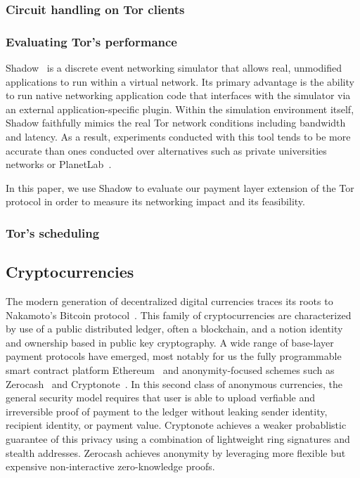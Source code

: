 \subsubsection{Circuit handling on Tor clients}

\subsubsection{Evaluating Tor's performance}
Shadow~\cite{jansen2011shadow} is a discrete event networking simulator that allows
real, unmodified applications to run within a virtual network. Its primary
advantage is the ability to run native networking application code that
interfaces with the simulator via an external application-specific
plugin. Within the simulation environment itself, Shadow faithfully mimics the
real Tor network conditions including bandwidth and latency. As a result,
experiments conducted with this tool tends to be more accurate than ones
conducted over alternatives such as private universities networks or
PlanetLab~\cite{Chun:2003:POT:956993.956995}.

In this paper, we use Shadow to evaluate our payment layer extension of the Tor
protocol in order to measure its networking impact and its feasibility.
\subsubsection{Tor's scheduling}


\subsection{Cryptocurrencies}

The modern generation of decentralized digital currencies traces its roots to
Nakamoto's Bitcoin protocol~\cite{nakamoto2008bitcoin}. This family of
cryptocurrencies are characterized by use of a public distributed ledger, often
a blockchain, and a notion identity and ownership based in public key
cryptography. A wide range of base-layer payment protocols have emerged, most
notably for us the fully programmable smart contract platform
Ethereum~\cite{wood2014ethereum} and anonymity-focused schemes such as
Zerocash~\cite{sasson2014zerocash} and Cryptonote~\cite{van2013cryptonote}. In
this second class of anonymous currencies, the general security model requires
that user is able to upload verfiable and irreversible proof of payment to the
ledger without leaking sender identity, recipient identity, or payment
value. Cryptonote achieves a weaker probablistic guarantee of this privacy using
a combination of lightweight ring signatures and stealth addresses. Zerocash
achieves anonymity by leveraging more flexible but expensive non-interactive
zero-knowledge proofs.

